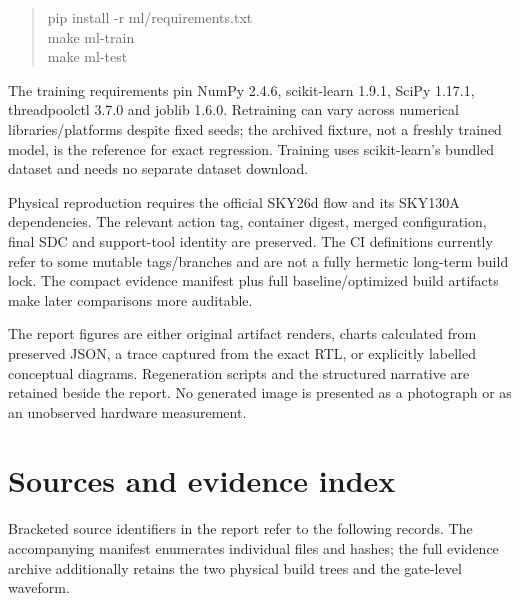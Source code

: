 \documentclass[10pt,letterpaper]{article}
\begin{document}
\begin{quote}\ttfamily\small pip install -r ml/requirements.txt\\
make ml-train\\
make ml-test\end{quote}
The training requirements pin NumPy 2.4.6, scikit-learn 1.9.1, SciPy 1.17.1, threadpoolctl 3.7.0 and joblib 1.6.0. Retraining can vary across numerical libraries/platforms despite fixed seeds; the archived fixture, not a freshly trained model, is the reference for exact regression. Training uses scikit-learn's bundled dataset and needs no separate dataset download.

Physical reproduction requires the official SKY26d flow and its SKY130A dependencies. The relevant action tag, container digest, merged configuration, final SDC and support-tool identity are preserved. The CI definitions currently refer to some mutable tags/branches and are not a fully hermetic long-term build lock. The compact evidence manifest plus full baseline/optimized build artifacts make later comparisons more auditable.

The report figures are either original artifact renders, charts calculated from preserved JSON, a trace captured from the exact RTL, or explicitly labelled conceptual diagrams. Regeneration scripts and the structured narrative are retained beside the report. No generated image is presented as a photograph or as an unobserved hardware measurement.

\clearpage
\section{Sources and evidence index}
Bracketed source identifiers in the report refer to the following records. The accompanying manifest enumerates individual files and hashes; the full evidence archive additionally retains the two physical build trees and the gate-level waveform.
\end{document}
